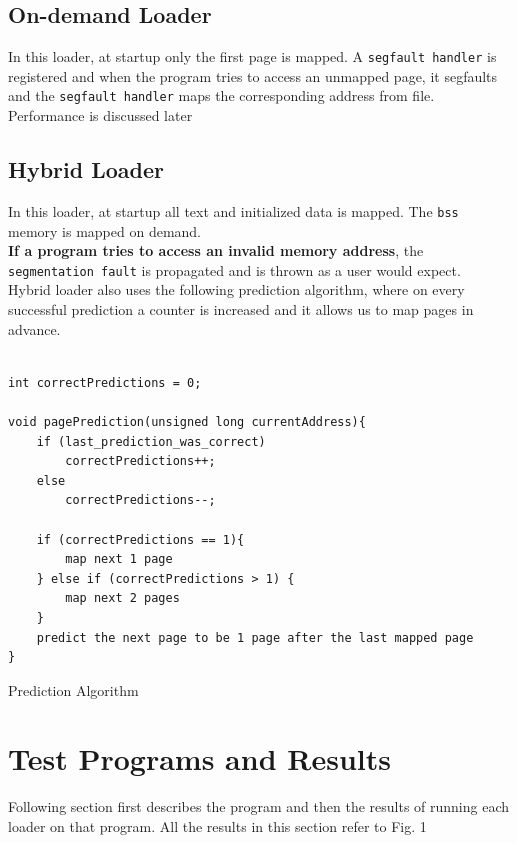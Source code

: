 \documentclass[10pt] {article}
\begin{document}
\subsection{On-demand Loader}
In this loader, at startup only the first page is mapped. A \texttt{segfault handler} is registered and when the program tries to access an unmapped page, it segfaults and the \texttt{segfault handler} maps the corresponding address from file. Performance is discussed later\\

\subsection{Hybrid Loader}
In this loader, at startup all text and initialized data is mapped. The \texttt{bss} memory is mapped on demand. \\

\textbf{If a program tries to access an invalid memory address}, the \texttt{segmentation fault} is propagated and is thrown as a user would expect. \\

Hybrid loader also uses the following prediction algorithm, where on every successful prediction a counter is increased and it allows us to map pages in advance.


\begin{listing}[ht!]
\begin{verbatim}

int correctPredictions = 0;

void pagePrediction(unsigned long currentAddress){
	if (last_prediction_was_correct)
		correctPredictions++;
	else 
		correctPredictions--;
		
	if (correctPredictions == 1){
		map next 1 page
	} else if (correctPredictions > 1) {
		map next 2 pages
	}
	predict the next page to be 1 page after the last mapped page
}

\end{verbatim}
\label{lst:sched}
\caption{Prediction Algorithm}
\end{listing}

\section{Test Programs and Results}
Following section first describes the program and then the results of running each loader on that program. All the results in this section refer to Fig. 1 %
\end{document}
